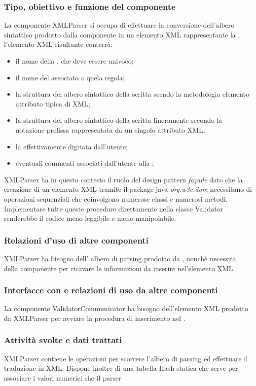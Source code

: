 \documentclass[11pt,titlepage,a4paper]{report}
\begin{document}
\subsubsection{Tipo, obiettivo e funzione del componente}
La componente XMLParser si occupa di effettuare la conversione dell'albero sintattico prodotto dalla componente \brp in un elemento XML rappresentante la \br, l'elemento XML risultante conterr\`a:
\begin{itemize}
 \item il nome della \br, che deve essere univoco;
 \item il nome del \bo associato a quela regola;
 \item la struttura del albero sintattico della \br scritta secndo la metodologia elemento-attributo tipica di XML;
 \item la struttura del albero sintattico della \br scritta lineramente secondo la notazione prefissa rappresentata da un singolo attributo XML;
 \item la \br effettivamente digitata dall'utente;
 \item eventuali commenti associati dall'utente alla \br;
\end{itemize}
XMLParser ha in questo contesto il ruolo del design pattern \textit{fa\c{c}ade} dato che la creazione di un elemento XML tramite il package java \textit{org.w3c.dom} necessitano di operazioni sequenziali che coinvolgono numerose classi e numerosi metodi. Implementare tutte queste procedure direttamente nella classe Validator renderebbe il codice meno leggibile e meno manipolabile.
\subsubsection{Relazioni d'uso di altre componenti}
XMLParser ha bisogno dell' albero di parsing prodotto da \brp, nonch\`e necessita della componente \br per ricavare le informazioni da inserire nel'elemento XML.
\subsubsection{Interfacce con e relazioni di uso da altre componenti}
La componente ValidatorCommunicator ha bisogno dell'elemento XML prodotto da XMLParser per avviare la procedura di inserimento nel \re.
\subsubsection{Attivit\`a svolte e dati trattati}
XMLParser contiene le operazioni per scorrere l'albero di parsing ed effettuare il traduzione in XML. Dispone inoltre di una tabella Hash statica che serve per associare i valori numerici che il parser 
\end{document}
